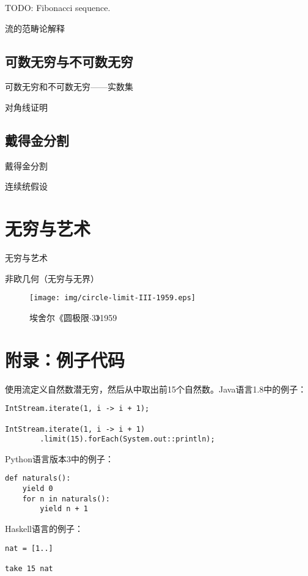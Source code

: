 \documentclass{article}
\begin{document}
TODO: Fibonacci sequence.

流的范畴论解释

\subsection{可数无穷与不可数无穷}
可数无穷和不可数无穷——实数集

对角线证明

\subsection{戴得金分割}
戴得金分割

连续统假设

\section{无穷与艺术}
无穷与艺术

非欧几何（无穷与无界）

\begin{figure}[htbp]
 \centering
 \texttt{[image: img/circle-limit-III-1959.eps]}
 \captionsetup{labelformat=empty}
 \caption{埃舍尔《圆极限$\cdot$3》1959}
 \label{fig:Penrose-triangle}
\end{figure}

\section{附录：例子代码}

使用流定义自然数潜无穷，然后从中取出前15个自然数。Java语言1.8中的例子：

\lstset{frame=single, language=Java}
\begin{lstlisting}
IntStream.iterate(1, i -> i + 1);

IntStream.iterate(1, i -> i + 1)
        .limit(15).forEach(System.out::println);
\end{lstlisting}

Python语言版本3中的例子：

\lstset{frame=single, language=Python}
\begin{lstlisting}
def naturals():
    yield 0
    for n in naturals():
        yield n + 1
\end{lstlisting}

Haskell语言的例子：

\lstset{frame=single, language=Haskell}
\begin{lstlisting}
nat = [1..]

take 15 nat
\end{lstlisting}
\end{document}
